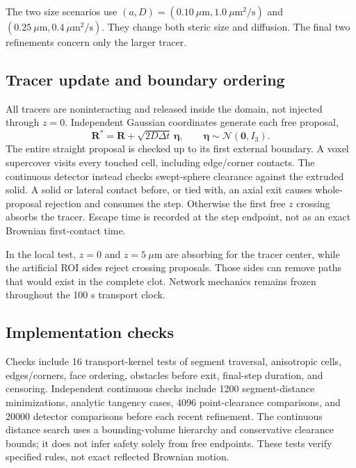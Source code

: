 \documentclass[a4paper,10pt]{article}
\numberwithin{equation}{section}
\begin{document}
The two size scenarios use $(a,D)=(0.10~\mu\mathrm{m},1.0~\mu\mathrm{m}^2/\mathrm{s})$ and $(0.25~\mu\mathrm{m},0.4~\mu\mathrm{m}^2/\mathrm{s})$. They change both steric size and diffusion. The final two refinements concern only the larger tracer.

\subsection*{Tracer update and boundary ordering}
All tracers are noninteracting and released inside the domain, not injected through $z=0$. Independent Gaussian coordinates generate each free proposal,
\begin{equation}
\mathbf R^*=\mathbf R+\sqrt{2D\Delta t}\,\boldsymbol{\eta},
\qquad \boldsymbol{\eta}\sim\mathcal N(\mathbf 0,I_3).
\end{equation}
The entire straight proposal is checked up to its first external boundary. A voxel supercover visits every touched cell, including edge/corner contacts. The continuous detector instead checks swept-sphere clearance against the extruded solid. A solid or lateral contact before, or tied with, an axial exit causes whole-proposal rejection and consumes the step. Otherwise the first free $z$ crossing absorbs the tracer. Escape time is recorded at the step endpoint, not as an exact Brownian first-contact time.

In the local test, $z=0$ and $z=5~\mu$m are absorbing for the tracer center, while the artificial ROI sides reject crossing proposals. Those sides can remove paths that would exist in the complete clot. Network mechanics remains frozen throughout the 100 s transport clock.

\subsection*{Implementation checks}
Checks include 16 transport-kernel tests of segment traversal, anisotropic cells, edges/corners, face ordering, obstacles before exit, final-step duration, and censoring. Independent continuous checks include 1200 segment-distance minimizations, analytic tangency cases, 4096 point-clearance comparisons, and 20000 detector comparisons before each recent refinement. The continuous distance search uses a bounding-volume hierarchy and conservative clearance bounds; it does not infer safety solely from free endpoints. These tests verify specified rules, not exact reflected Brownian motion.
\end{document}
